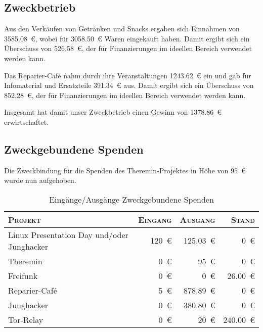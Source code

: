 \documentclass[ngerman]{scrartcl}
\begin{document}
\subsection{Zweckbetrieb}
\label{sec:Zweckbetrieb}
Aus den Verkäufen von Getränken und Snacks ergaben sich Einnahmen von \num{3585,08}~\euro{}, wobei für \num{3058,50}~\euro{} Waren eingekauft haben.
Damit ergibt sich ein Überschuss von \num{526,58}~\euro{}, der für Finanzierungen im ideellen Bereich verwendet werden kann.

Das Reparier-Café nahm durch ihre Veranstaltungen \num{1243,62}~\euro{} ein und gab für Infomaterial und Ersatzteile \num{391,34}~\euro{} aus.
Damit ergibt sich ein Überschuss von \num{852,28}~\euro{}, der für Finanzierungen im ideellen Bereich verwendet werden kann.

Insgesamt hat damit unser Zweckbetrieb einen Gewinn von \num{1378,86}~\euro{} erwirtschaftet.

\subsection{Zweckgebundene Spenden}
\label{sec:zweckgebundene_spenden}

Die Zweckbindung für die Spenden des Theremin-Projektes in Höhe von \num{95}~\euro{} wurde nun aufgehoben.

\begin{table}[h]
        \centering
        \begin{tabular}{l|r|r|r}
        \toprule
        \textsc{Projekt} & \textsc{Eingang} & \textsc{Ausgang} & \textsc{Stand} \\
        \midrule
        Linux Presentation Day und/oder Junghacker & \num{120}~\euro{} & \num{125,03}~\euro{} & \num{0}~\euro{} \\
        Theremin & \num{0}~\euro{} & \num{95}~\euro{} & \num{0}~\euro{} \\
        Freifunk & \num{0}~\euro{} & \num{0}~\euro{} & \num{26,00}~\euro{} \\
        Reparier-Café & \num{5}~\euro{} & \num{878,89}~\euro{} & \num{0}~\euro{} \\
        Junghacker & \num{0}~\euro{} & \num{380,80}~\euro{} & \num{0}~\euro{} \\
        Tor-Relay & \num{0}~\euro{} & \num{20}~\euro{} & \num{240,00}~\euro{} \\
\bottomrule
        \end{tabular}
        \caption{Eingänge/Ausgänge Zweckgebundene Spenden}
        \label{table:spenden}
\end{table}
\end{document}
